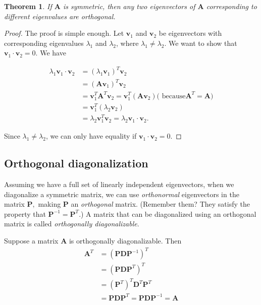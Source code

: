 \documentclass[
]{book}
\newtheorem{theorem}{Theorem}[chapter]
\theoremstyle{definition}
\theoremstyle{definition}
\theoremstyle{definition}
\theoremstyle{definition}
\theoremstyle{remark}
\begin{document}
\begin{theorembox}

\begin{theorem}
If \(\mathbf{A}\) is symmetric, then any two eigenvectors of \(\mathbf{A}\) corresponding to different eigenvalues are orthogonal.
\end{theorem}

\end{theorembox}

\begin{proof}
The proof is simple enough. Let \(\mathbf{v}_1\) and \(\mathbf{v}_2\) be eigenvectors with corresponding eigenvalues \(\lambda_1\) and \(\lambda_2\), where \(\lambda_1\neq \lambda_2\). We want to show that \(\mathbf{v}_1\cdot \mathbf{v}_2=0\). We have

\begin{align*}
    \lambda_1\mathbf{v}_1\cdot \mathbf{v}_2&=(\lambda_1\mathbf{v}_1)^T\mathbf{v}_2\\
    &=(\mathbf{A}\mathbf{v}_1)^T\mathbf{v}_2\\
    &=\mathbf{v}_1^T\mathbf{A}^T\mathbf{v}_2=\mathbf{v}_1^T(\mathbf{A}\mathbf{v}_2) \text{( because} \mathbf{A}^T=\mathbf{A})\\
    &=\mathbf{v}_1^T(\lambda_2\mathbf{v}_2)\\
    &=\lambda_2\mathbf{v}_1^T\mathbf{v}_2=\lambda_2\mathbf{v}_1\cdot \mathbf{v}_2.
\end{align*}

Since \(\lambda_1\neq \lambda_2\), we can only have equality if \(\mathbf{v}_1\cdot \mathbf{v}_2=0\).
\end{proof}

\subsection*{Orthogonal diagonalization}\label{orthogonal-diagonalization}

Assuming we have a full set of linearly independent eigenvectors, when we diagonalize a symmetric matrix, we can use \emph{orthonormal} eigenvectors in the matrix \(\mathbf{P},\) making \(\mathbf{P}\) an \emph{orthogonal} matrix. (Remember them? They satisfy the property that \(\mathbf{P}^{-1}=\mathbf{P}^T\).) A matrix that can be diagonalized using an orthogonal matrix is called \emph{orthogonally diagonalizable}.

Suppose a matrix \(\mathbf{A}\) is orthogonally diagonalizable. Then
\begin{align*}
\mathbf{A}^T&=(\mathbf{P}\mathbf{D}\mathbf{P}^{-1})^T\\
    &=(\mathbf{P}\mathbf{D}\mathbf{P}^T)^T\\
    &=(\mathbf{P}^T)^T\mathbf{D}^T\mathbf{P}^T\\
    &=\mathbf{P}\mathbf{D}\mathbf{P}^T=\mathbf{P}\mathbf{D}\mathbf{P}^{-1}=\mathbf{A}
\end{align*}
\end{document}
